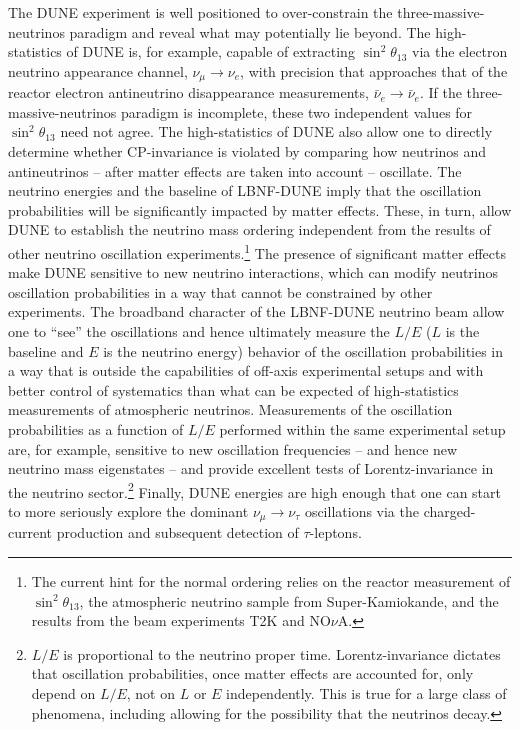 The DUNE experiment is well positioned to over-constrain  the three-massive-neutrinos paradigm and reveal what may potentially lie beyond. The high-statistics of DUNE is, for example, capable of extracting $\sin^2\theta_{13}$ via the electron neutrino appearance channel, $\nu_{\mu}\to\nu_e$, with precision that approaches that of the reactor electron antineutrino disappearance measurements, $\bar{\nu}_e\to\bar{\nu}_e$. If the three-massive-neutrinos paradigm is incomplete, these two independent values for $\sin^2\theta_{13}$ need not agree. The high-statistics of DUNE also allow one to directly determine whether CP-invariance is violated by comparing how neutrinos and antineutrinos -- after matter effects are taken into account -- oscillate. The neutrino energies and the baseline of LBNF-DUNE imply that the oscillation probabilities will be significantly impacted by matter effects. These, in turn, allow DUNE to establish the neutrino mass ordering independent from the results of other neutrino oscillation experiments.\footnote{The current hint for the normal ordering relies on the reactor measurement of $\sin^2\theta_{13}$, the atmospheric neutrino sample from Super-Kamiokande, and the results from the beam experiments T2K and NO$\nu$A.} The presence of significant matter effects make DUNE sensitive to new neutrino interactions, which can modify neutrinos oscillation probabilities in a way that cannot be constrained by other experiments. The broadband character of the LBNF-DUNE neutrino beam allow one to ``see'' the oscillations and hence ultimately measure the $L/E$ ($L$ is the baseline and $E$ is the neutrino energy) behavior of the oscillation probabilities in a way that is outside the capabilities of off-axis experimental setups and with better control of systematics than what can be expected of high-statistics measurements of atmospheric neutrinos. Measurements of the oscillation probabilities as a function of $L/E$ performed within the same experimental setup are, for example, sensitive to new oscillation frequencies -- and hence new neutrino mass eigenstates -- and provide excellent tests of Lorentz-invariance in the neutrino sector.\footnote{$L/E$ is proportional to the neutrino proper time. Lorentz-invariance dictates that oscillation probabilities, once matter effects are accounted for, only depend on $L/E$, not on $L$ or $E$ independently. This is true for a large class of phenomena, including allowing for the possibility that the neutrinos decay.} Finally, DUNE energies are high enough that one can start to more seriously explore the dominant $\nu_{\mu}\to\nu_{\tau}$ oscillations via the charged-current production and subsequent detection of $\tau$-leptons. 

